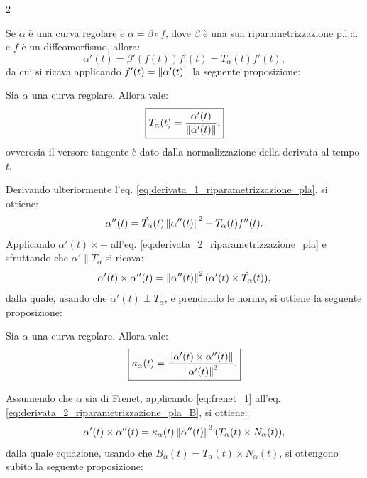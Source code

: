 \begin{multicols*}{2}
    \begin{remark}
        Se $\alpha$ è una curva regolare e $\alpha = \beta \circ f$, dove $\beta$ è una
        sua riparametrizzazione p.l.a. e $f$ è un diffeomorfismo, allora:
        \begin{equation} \label{eq:derivata_1_riparametrizzazione_pla}
            \alpha'(t) = \beta'(f(t)) f'(t) = T_\alpha(t) f'(t),
        \end{equation}
        da cui si ricava applicando $f'(t) = \left\lVert \alpha'(t) \right\rVert$ la seguente proposizione:
    \end{remark}

    \begin{proposition}
        Sia $\alpha$ una curva regolare. Allora vale:
        \[
            \boxed{T_\alpha(t) = \frac{\alpha'(t)}{\left\lVert \alpha'(t) \right\rVert},}
        \]
        ovverosia il versore tangente è dato dalla normalizzazione
        della derivata al tempo $t$.
    \end{proposition}

    \begin{remark}
        Derivando ulteriormente l'eq. \eqref{eq:derivata_1_riparametrizzazione_pla}, si ottiene:
        \begin{equation} \label{eq:derivata_2_riparametrizzazione_pla}
            \alpha''(t) = \dot{T_\alpha}(t) \left\lVert \alpha''(t) \right\rVert^2 + T_\alpha(t) f''(t).
        \end{equation}
        Applicando $\alpha'(t) \times -$ all'eq. \eqref{eq:derivata_2_riparametrizzazione_pla} e
        sfruttando che $\alpha' \parallel T_\alpha$ si ricava:
        \begin{equation} \label{eq:derivata_2_riparametrizzazione_pla_B}
            \alpha'(t) \times \alpha''(t) = \left\lVert \alpha''(t) \right\rVert^2 (\alpha'(t) \times \dot{T_\alpha}(t)),
        \end{equation}
        dalla quale, usando che $\alpha'(t) \perp \dot{T_\alpha}$, e prendendo le norme, si ottiene
        la seguente proposizione:
    \end{remark}

    \begin{proposition}
        Sia $\alpha$ una curva regolare. Allora vale:
        \[
            \boxed{\kappa_\alpha(t) = \frac{\left\lVert \alpha'(t) \times \alpha''(t) \right\rVert}{\left\lVert \alpha'(t) \right\rVert^3}.}
        \]
    \end{proposition}

    \begin{remark}
        Assumendo che $\alpha$ sia di Frenet, applicando \eqref{eq:frenet_1}
        all'eq. \eqref{eq:derivata_2_riparametrizzazione_pla_B}, si ottiene:
        \[
            \alpha'(t) \times \alpha''(t) = \kappa_\alpha(t) \left\lVert \alpha''(t) \right\rVert^3 (T_\alpha(t) \times N_\alpha(t)),
        \]
        dalla quale equazione, usando che $B_\alpha(t) = T_\alpha(t) \times N_\alpha(t)$, si ottengono subito
        la seguente proposizione:
    \end{remark}


\end{multicols*}
